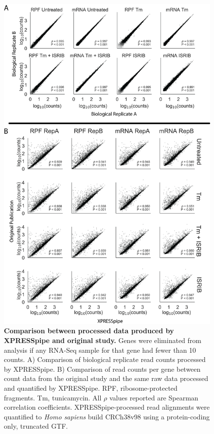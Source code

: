 \documentclass[10pt, oneside]{article}
\begin{document}
\begin{figure}
\centering
  \includegraphics[width=140mm]{figures/xpresspipe_supplement3.png}
  \caption{\textbf{Comparison between processed data produced by XPRESSpipe and original study.} Genes were eliminated from analysis if any RNA-Seq sample for that gene had fewer than 10 counts. A) Comparison of biological replicate read counts processed by XPRESSpipe. B) Comparison of read counts per gene between count data from the original study and the same raw data processed and quantified by XPRESSpipe. RPF, ribosome-protected fragments. Tm, tunicamycin. All $\rho$ values reported are Spearman correlation coefficients. XPRESSpipe-processed read alignments were quantified to \textit{Homo sapiens} build CRCh38v98 using a protein-coding only, truncated GTF.}
  \label{fig:supplement3}
\end{figure}
\end{document}

